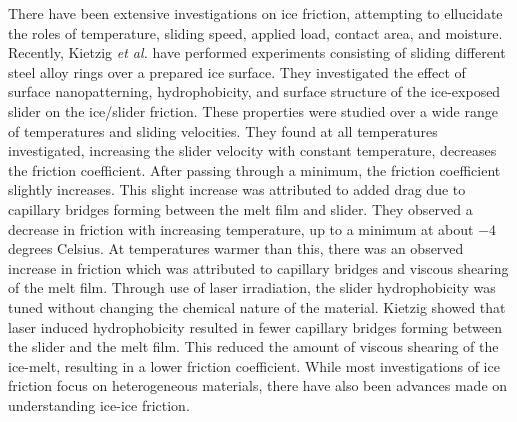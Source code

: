 There have been
extensive investigations on ice friction, attempting to ellucidate the
roles of temperature\cite{Roberts1981,Higgins2008,Bowden1939,Evans1976,Derjaguin1988,Liang2003}, sliding
speed\cite{Evans1976,Derjaguin1988,Liang2003}, applied load\cite{Buhl2001,Bowden1939,Derjaguin1988,Baurle2006,Oksanen1982},
contact area\cite{Bowden1939,Baurle2007}, and
moisture\cite{Calabrese1980}. Recently, 
Kietzig \textit{et al.} have performed experiments consisting of sliding 
different steel alloy rings over a prepared ice surface.\cite{Kietzig2009} 
They investigated the effect of surface nanopatterning, hydrophobicity, and 
surface structure of the ice-exposed slider on the ice/slider friction. 
These properties were studied over a wide 
range of temperatures and sliding velocities. They found at all temperatures 
investigated, increasing the slider velocity with constant temperature, 
decreases the friction coefficient. After passing through a minimum, the 
friction coefficient slightly increases. This slight increase was attributed 
to added drag due to capillary bridges forming between the melt film and 
slider. They observed a decrease in friction with increasing temperature, 
up to a minimum at about $-4$ 
degrees Celsius. At temperatures warmer than this, there was an observed 
increase in friction which was attributed to capillary bridges and viscous 
shearing of the melt film. 
Through use of laser irradiation, the slider hydrophobicity was tuned
without changing the chemical nature of the material. Kietzig
showed that laser induced hydrophobicity resulted in fewer capillary 
bridges forming between the slider and the melt film. This reduced the amount
of viscous shearing of the ice-melt, resulting in a lower 
friction coefficient. 
While most investigations of ice friction focus on heterogeneous
materials\cite{Bowden1939,Evans1976,Derjaguin1988,Liang2003,Liang2005,Baurle2006,Baurle2007,Kietzig2009,Kietzig2010},
there have also been advances made on understanding ice-ice friction\cite{Oksanen1982,Kennedy2000,Maeno2004,Fortt2007,Fortt2011,Lishman2011,Samadashvili2013}.

